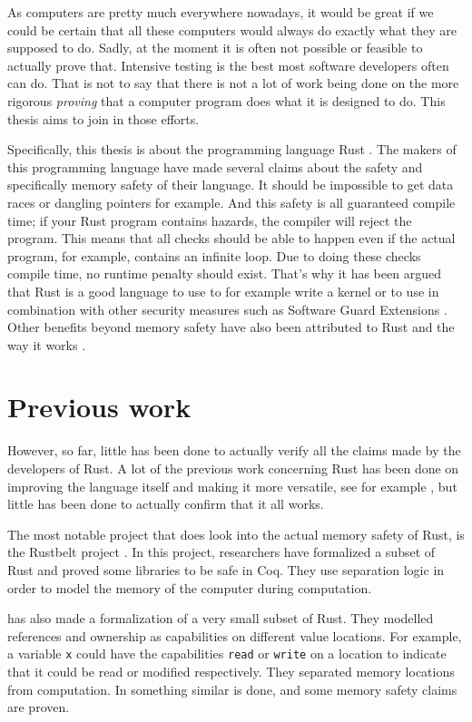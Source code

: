 As computers are pretty much everywhere nowadays, it would be great if we could be certain that all these computers would always do exactly what they are supposed to do. Sadly, at the moment it is often not possible or feasible to actually prove that. Intensive testing is the best most software developers often can do. That is not to say that there is not a lot of work being done on the more rigorous \emph{proving} that a computer program does what it is designed to do. This thesis aims to join in those efforts. 

Specifically, this thesis is about the programming language Rust \citep{matsakis2014rust}. The makers of this programming language have made several claims about the safety and specifically memory safety of their language. It should be impossible to get data races or dangling pointers for example. And this safety is all guaranteed compile time; if your Rust program contains hazards, the compiler will reject the program. This means that all checks should be able to happen even if the actual program, for example, contains an infinite loop. Due to doing these checks compile time, no runtime penalty should exist. That's why it has been argued that Rust is a good language to use to for example write a kernel \citep{levy2017kernel} or to use in combination with other security measures such as Software Guard Extensions \citep{ding2017sgx}. Other benefits beyond memory safety have also been attributed to Rust and the way it works \citep{balasubramanian2017system}.

\section{Previous work}
However, so far, little has been done to actually verify all the claims made by the developers of Rust. A lot of the previous work concerning Rust has been done on improving the language itself and making it more versatile, see for example \cite{jespersen2015session}, but little has been done to actually confirm that it all works. 

The most notable project that does look into the actual memory safety of Rust, is the Rustbelt project \citep{jung2017rustbelt}. In this project, researchers have formalized a subset of Rust and proved some libraries to be safe in Coq. They use separation logic in order to model the memory of the computer during computation. 

\cite{benitez2016rusty} has also made a formalization of a very small subset of Rust. They modelled references and ownership as capabilities on different value locations. For example, a variable \verb|x| could have the capabilities \texttt{read} or \texttt{write} on a location to indicate that it could be read or modified respectively. They separated memory locations from computation. In \cite{reed2015patina} something similar is done, and some memory safety claims are proven. 

